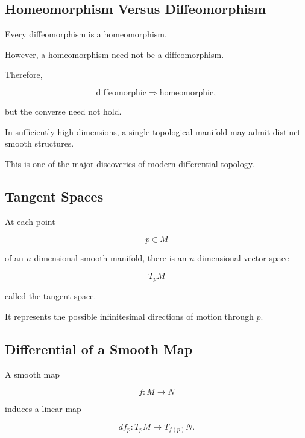 \subsection{Homeomorphism Versus Diffeomorphism}
\label{subsec:homeomorphism-vs-diffeomorphism}

Every diffeomorphism is a homeomorphism.

However, a homeomorphism need not be a diffeomorphism.

Therefore,

\[
\boxed{
\text{diffeomorphic}
\Longrightarrow
\text{homeomorphic},
}
\]

but the converse need not hold.

In sufficiently high dimensions, a single topological manifold may admit
distinct smooth structures.

This is one of the major discoveries of modern differential topology.

\subsection{Tangent Spaces}
\label{subsec:differential-topology-tangent-spaces}

At each point

\[
p\in M
\]

of an \(n\)-dimensional smooth manifold, there is an \(n\)-dimensional
vector space

\[
\boxed{
T_pM
}
\]

called the tangent space.

It represents the possible infinitesimal directions of motion through
\(p\).

\subsection{Differential of a Smooth Map}
\label{subsec:differential-smooth-map}

A smooth map

\[
f:M\to N
\]

induces a linear map

\[
\boxed{
df_p:T_pM\to T_{f(p)}N.
}
\]

